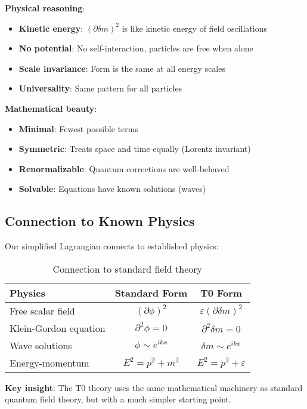 \documentclass[12pt,a4paper]{article}
\newcommand{\deltam}{\delta m}
\theoremstyle{definition}
\theoremstyle{remark}
\begin{document}
	\textbf{Physical reasoning}:
	\begin{itemize}
		\item \textbf{Kinetic energy}: $(\partial \deltam)^2$ is like kinetic energy of field oscillations
		\item \textbf{No potential}: No self-interaction, particles are free when alone
		\item \textbf{Scale invariance}: Form is the same at all energy scales
		\item \textbf{Universality}: Same pattern for all particles
	\end{itemize}
	
	\textbf{Mathematical beauty}:
	\begin{itemize}
		\item \textbf{Minimal}: Fewest possible terms
		\item \textbf{Symmetric}: Treats space and time equally (Lorentz invariant)
		\item \textbf{Renormalizable}: Quantum corrections are well-behaved
		\item \textbf{Solvable}: Equations have known solutions (waves)
	\end{itemize}
	
	\subsection{Connection to Known Physics}
	
	Our simplified Lagrangian connects to established physics:
	
	\begin{table}[htbp]
		\centering
		\begin{tabular}{lcc}
			\toprule
			\textbf{Physics} & \textbf{Standard Form} & \textbf{T0 Form} \\
			\midrule
			Free scalar field & $(\partial \phi)^2$ & $\varepsilon(\partial \deltam)^2$ \\
			Klein-Gordon equation & $\partial^2 \phi = 0$ & $\partial^2 \deltam = 0$ \\
			Wave solutions & $\phi \sim e^{ikx}$ & $\deltam \sim e^{ikx}$ \\
			Energy-momentum & $E^2 = p^2 + m^2$ & $E^2 = p^2 + \varepsilon$ \\
			\bottomrule
		\end{tabular}
		\caption{Connection to standard field theory}
		\label{tab:standard_connection}
	\end{table}
	
	\textbf{Key insight}: The T0 theory uses the same mathematical machinery as standard quantum field theory, but with a much simpler starting point.
	
\end{document}

